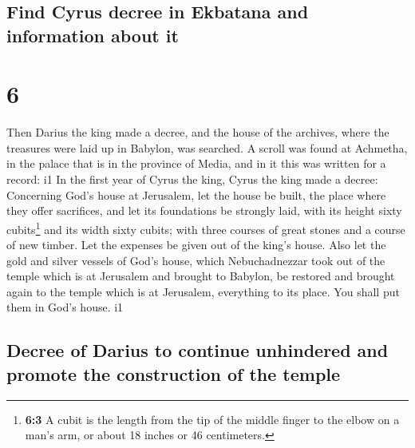 \hypertarget{find-cyrus-decree-in-ekbatana-and-information-about-it}{%
\subsection{Find Cyrus decree in Ekbatana and information about
it}\label{find-cyrus-decree-in-ekbatana-and-information-about-it}}

\hypertarget{section-5}{%
\section{6}\label{section-5}}

 Then Darius the king made a decree, and the house of the
archives, where the treasures were laid up in Babylon, was searched.
 A scroll was found at Achmetha, in the palace that is in
the province of Media, and in it this was written for a record: i1
 In the first year of Cyrus the king, Cyrus the king made
a decree: Concerning God's house at Jerusalem, let the house be built,
the place where they offer sacrifices, and let its foundations be
strongly laid, with its height sixty cubits\footnote{\textbf{6:3} A
  cubit is the length from the tip of the middle finger to the elbow on
  a man's arm, or about 18 inches or 46 centimeters.} and its width
sixty cubits;  with three courses of great stones and a
course of new timber. Let the expenses be given out of the king's house.
 Also let the gold and silver vessels of God's house,
which Nebuchadnezzar took out of the temple which is at Jerusalem and
brought to Babylon, be restored and brought again to the temple which is
at Jerusalem, everything to its place. You shall put them in God's
house. i1

\hypertarget{decree-of-darius-to-continue-unhindered-and-promote-the-construction-of-the-temple}{%
\subsection{Decree of Darius to continue unhindered and promote the
construction of the
temple}\label{decree-of-darius-to-continue-unhindered-and-promote-the-construction-of-the-temple}}

